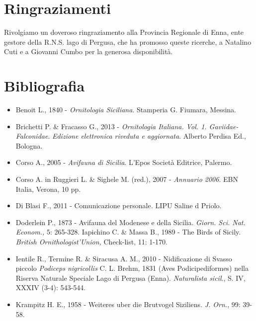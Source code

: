 \section*{Ringraziamenti}
Rivolgiamo un doveroso ringraziamento alla Provincia Regionale di Enna,
ente gestore della R.N.S. lago di Pergusa, che ha promosso queste
ricerche, a Natalino Cuti e a Giovanni Cumbo per la generosa
disponibilit\`a.

\section*{Bibliografia}
\begin{itemize}\itemsep0pt
 \item {Benoit L., 1840 -
}\textit{{Ornitologia Siciliana}}{.
Stamperia G. Fiumara, Messina.}

 \item {Brichetti P.} \&{ Fracasso G., 2013 -
}\textit{{Ornitologia Italiana. Vol. 1.
Gaviidae-Falconidae}}{.
}\textit{{Edizione elettronica riveduta e
aggiornata}}{. Alberto Perdisa Ed., Bologna.}

 \item {Corso A., 2005 - }\textit{{Avifauna
di Sicilia}}{. L{\textquoteright}Epos Societ\`a
Editrice, Palermo.}

 \item {Corso A. in Ruggieri L. \& Sighele M. (red.), 2007 -
}\textit{{Annuario 2006}}{. EBN
Italia, Verona, 10 pp.}

 \item {Di Blasi F., 2011 - Comunicazione
personale}\textit{{. }}{LIPU Saline d
Priolo.}

 \item {Doderlein P., 1873 - Avifauna del Modenese e della
Sicilia. }\textit{{Giorn. Sci. Nat.
}}\textit{{Econom.,}}{ 5: 265-328.
Iapichino C. \& Massa B., 1989 - The Birds of Sicily.
}\textit{{British Ornithologist{\textquoteright}Union,
}}{Check-list, 11: 1-170.}

 \item {Ientile R., Termine R. \& Siracusa A. M., 2010 -
Nidificazione di Svasso piccolo }\textit{{Podiceps
nigricollis}}{ C. L. Brehm, 1831 (Aves
Podicipediformes) nella Riserva Naturale Speciale
Lago}\textit{{ }}{di Pergusa (Enna).
}\textit{{Naturalista  sicil}}{., S.
IV, XXXIV (3-4): 543-544.}

 \item {Krampitz H. E., 1958 - Weiteres uber die Brutvogel
Siziliens. }\textit{{J. Orn.}}{, 99:
39-58.}


\end{itemize}
